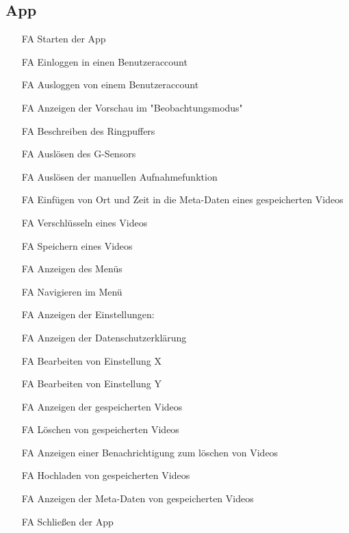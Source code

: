 \subsection{App}
\begin{itemize}
\item[FA] Starten der App

\item[FA] Einloggen in einen Benutzeraccount

\item[FA] Ausloggen von einem Benutzeraccount

\item[FA] Anzeigen der Vorschau im "Beobachtungsmodus"

\item[FA] Beschreiben des Ringpuffers

\item[FA] Auslösen des G-Sensors

\item[FA] Auslösen der manuellen Aufnahmefunktion

\item[FA] Einfügen von Ort und Zeit in die Meta-Daten eines gespeicherten Videos

\item[FA] Verschlüsseln eines Videos

\item[FA] Speichern eines Videos

\item[FA] Anzeigen des Menüs

\item[FA] Navigieren im Menü

\item[FA] Anzeigen der Einstellungen:

\item[FA] Anzeigen der Datenschutzerklärung

\item[FA] Bearbeiten von Einstellung X

\item[FA] Bearbeiten von Einstellung Y

\item[FA] Anzeigen der gespeicherten Videos

\item[FA] Löschen von gespeicherten Videos

\item[FA] Anzeigen einer Benachrichtigung zum löschen von Videos

\item[FA] Hochladen von gespeicherten Videos

\item[FA] Anzeigen der Meta-Daten von gespeicherten Videos

\item[FA] Schließen der App
\end{itemize}